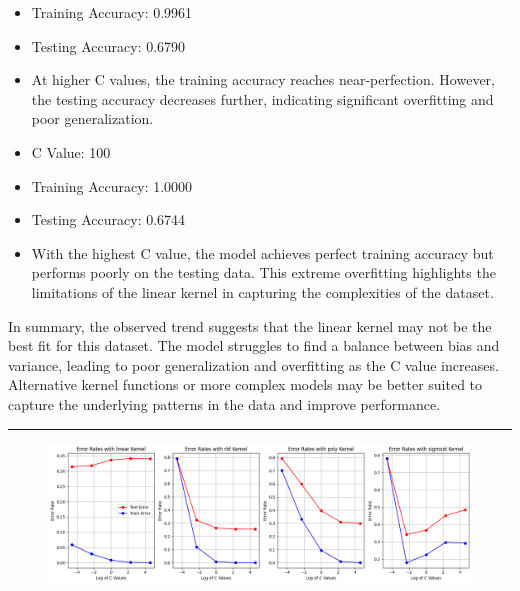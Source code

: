 \documentclass[a4paper,10 pt]{article}
\begin{document}
\begin{itemize}
    \item[] Training Accuracy: 0.9961
    \item[] Testing Accuracy: 0.6790
    \item[] At higher C values, the training accuracy reaches near-perfection. However, the testing accuracy decreases further, indicating significant overfitting and poor generalization.
    
    \item C Value: 100
    
    \item[] Training Accuracy: 1.0000
    \item[] Testing Accuracy: 0.6744
    \item[] With the highest C value, the model achieves perfect training accuracy but performs poorly on the testing data. This extreme overfitting highlights the limitations of the linear kernel in capturing the complexities of the dataset.
    
    \end{itemize}
    
    \vspace{12pt}
    In summary, the observed trend suggests that the linear kernel may not be the best fit for this dataset. The model struggles to find a balance between bias and variance, leading to poor generalization and overfitting as the C value increases. Alternative kernel functions or more complex models may be better suited to capture the underlying patterns in the data and improve performance.
   

  \vspace{12pt}
   \hrule 
  \vspace{12pt}


  \begin{figure}[H]
      \centering
      \includegraphics[width=1\textwidth]{graphQ5d1.png} %
    \end{figure}
    
    \vspace{12pt}
\end{document}
